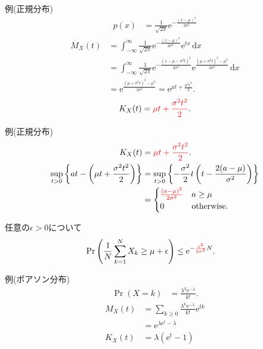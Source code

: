 \documentclass[lualatex,handout]{beamer}
\newcommand{\emm}[1]{\textcolor{red}{#1}}
\newcommand\dx{{\,\mathrm{d}x}}
\theoremstyle{definition}
\begin{document}
\begin{frame}{例(正規分布)}
\begin{align*}
p(x) &= \frac1{\sqrt{2\pi}} \mathrm{e}^{-\frac{(x-\mu)^2}{2\sigma^2}}
\end{align*}
\begin{align*}
M_X(t) &= \int_{-\infty}^\infty\frac1{\sqrt{2\pi}} \mathrm{e}^{-\frac{(x-\mu)^2}{2\sigma^2}} \mathrm{e}^{tx}\dx\\
 &= \int_{-\infty}^\infty\frac1{\sqrt{2\pi}} \mathrm{e}^{-\frac{(x-\mu -\sigma^2t)^2}{2\sigma^2}} \mathrm{e}^{\frac{(\mu+\sigma^2t)^2-\mu^2}{2\sigma^2}}\dx\\
&=\mathrm{e}^{\frac{(\mu+\sigma^2t)^2-\mu^2}{2\sigma^2}}
=\mathrm{e}^{\mu t + \frac{\sigma^2t^2}2}.
\end{align*}
\begin{align*}
K_X(t) &= \emm{\mu t + \frac{\sigma^2t^2}2}.\\
\end{align*}
\end{frame}

\begin{frame}{例(正規分布)}
\begin{align*}
K_X(t) &= \emm{\mu t + \frac{\sigma^2t^2}2}.\\
\sup_{t>0} \left\{at - \left(\mu t + \frac{\sigma^2t^2}2\right)\right\} &= 
\sup_{t>0} \left\{-\frac{\sigma^2}2 t\left(t-\frac{2(a-\mu)}{\sigma^2}\right) \right\}\\
 &= 
\begin{cases}
\emm{\frac{(a-\mu)^2}{2\sigma^2}}& a \ge \mu\\
0&\text{otherwise.}
\end{cases}
\end{align*}

\vspace{1em}
任意の$\epsilon>0$について
\begin{align*}
\Pr\left(\frac1N\sum_{k=1}^N X_k \ge \mu + \epsilon\right) &\le \mathrm{e}^{-\emm{\frac{\epsilon^2}{2\sigma^2}}N}.
\end{align*}
\end{frame}

\begin{frame}{例(ポアソン分布)}
\begin{align*}
\Pr(X=k) &= \frac{\lambda^k\mathrm{e}^{-\lambda}}{k!}.
\end{align*}
\begin{align*}
M_X(t) &= \sum_{k\ge 0}\frac{\lambda^k\mathrm{e}^{-\lambda}}{k!} \mathrm{e}^{tk}\\
&= \mathrm{e}^{\lambda\mathrm{e}^t - \lambda}\\
K_X(t) &= \lambda(\mathrm{e}^t-1)
\end{align*}
\end{frame}
\end{document}
